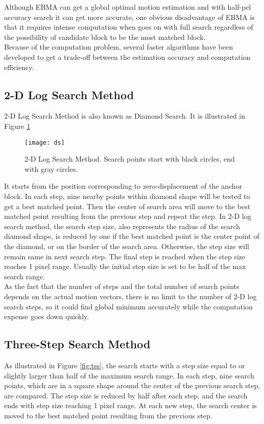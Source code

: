 \documentclass[a4paper, twocolumn]{article}
\begin{document}
	\noindent
	Although EBMA can get a global optimal motion estimation and with half-pel accuracy search it can get more accurate, one obvious disadvantage of EBMA is that it requires intense computation when goes on with full search regardless of the possibility of candidate block to be the most matched block. \\
	Because of the computation problem, several faster algorithms have been developed to get a trade-off between the estimation accuracy and computation efficiency.
	
	\subsection{2-D Log Search Method}
	2-D Log Search Method is also known as Diamond Search. It is illustrated in Figure \ref{fig:ds}
	
	\begin{figure}[h]
	\centering
	\texttt{[image: ds]}
	\caption{2-D Log Search Method. Search points start with black circles, end with gray circles.}
	\label{fig:ds}
	\end{figure}

	\noindent
	It starts from the position corresponding to zero-displacement of the anchor block. In each step, nine nearby points within diamond shape will be tested to get a best matched point. Then the center of search area will move to the best matched point resulting from the previous step and repeat the step. In 2-D log search method, the search step size, also represents the radius of the search diamond shape, is reduced by one if the best matched point is the center point of the diamond, or on the border of the search area. Otherwise, the step size will remain same in next search step.
	The final step is reached when the step size reaches 1 pixel range. Usually the initial step size is set to be half of the max search range. \\
	As the fact that the number of steps and the total number of search points depends on the actual motion vectors, there is no limit to the number of 2-D log search steps, so it could find global minimum accurately while the computation expense goes down quickly.
	
	\subsection{Three-Step Search Method}
	As illustrated in Figure \ref{fig:tss}, the search starts with a step size equal to or slightly larger than half of the maximum search range. In each step, nine search points, which are in a square shape around the center of the previous search step, are compared. The step size is reduced by half after each step, and the search ends with step size reaching 1 pixel range. At each new step, the search center is moved to the best matched point resulting from the previous step.
	
\end{document}

